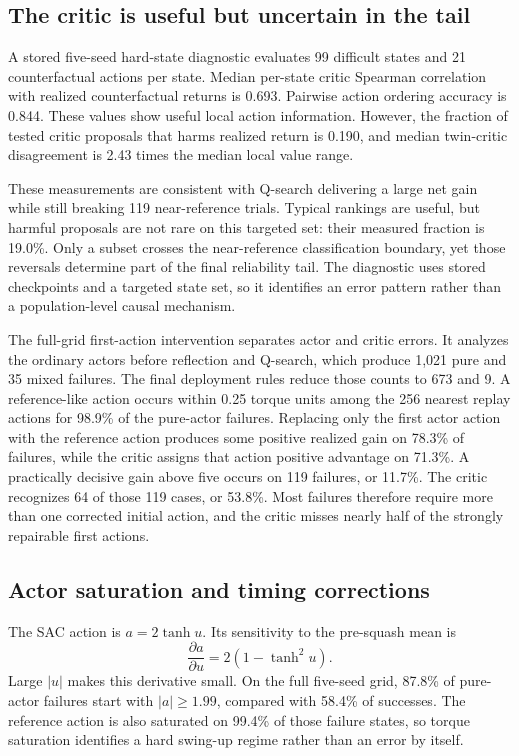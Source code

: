 \documentclass[10pt,twocolumn]{article}
\begin{document}
\subsection{The critic is useful but uncertain in the tail}

A stored five-seed hard-state diagnostic evaluates 99 difficult states and 21 counterfactual actions per state. Median per-state critic Spearman correlation with realized counterfactual returns is 0.693. Pairwise action ordering accuracy is 0.844. These values show useful local action information. However, the fraction of tested critic proposals that harms realized return is 0.190, and median twin-critic disagreement is 2.43 times the median local value range.

These measurements are consistent with Q-search delivering a large net gain while still breaking 119 near-reference trials. Typical rankings are useful, but harmful proposals are not rare on this targeted set: their measured fraction is 19.0\%. Only a subset crosses the near-reference classification boundary, yet those reversals determine part of the final reliability tail. The diagnostic uses stored checkpoints and a targeted state set, so it identifies an error pattern rather than a population-level causal mechanism.

The full-grid first-action intervention separates actor and critic errors. It analyzes the ordinary actors before reflection and Q-search, which produce 1,021 pure and 35 mixed failures. The final deployment rules reduce those counts to 673 and 9. A reference-like action occurs within 0.25 torque units among the 256 nearest replay actions for 98.9\% of the pure-actor failures. Replacing only the first actor action with the reference action produces some positive realized gain on 78.3\% of failures, while the critic assigns that action positive advantage on 71.3\%. A practically decisive gain above five occurs on 119 failures, or 11.7\%. The critic recognizes 64 of those 119 cases, or 53.8\%. Most failures therefore require more than one corrected initial action, and the critic misses nearly half of the strongly repairable first actions.

\subsection{Actor saturation and timing corrections}

The SAC action is $a=2\tanh u$. Its sensitivity to the pre-squash mean is
\[
\frac{\partial a}{\partial u}=2(1-\tanh^2u).
\]
Large $|u|$ makes this derivative small. On the full five-seed grid, 87.8\% of pure-actor failures start with $|a|\geq1.99$, compared with 58.4\% of successes. The reference action is also saturated on 99.4\% of those failure states, so torque saturation identifies a hard swing-up regime rather than an error by itself.
\end{document}
